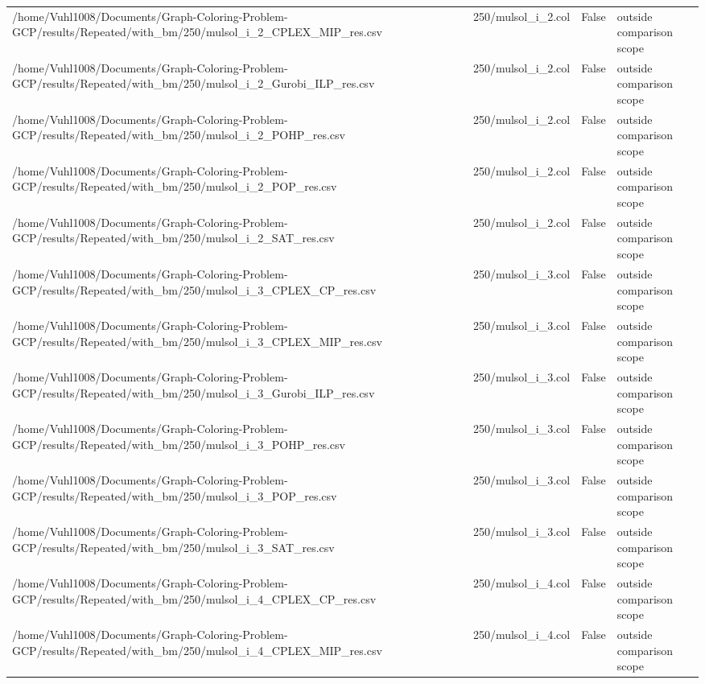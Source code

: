 \begin{table}[htbp]
\begin{tabular}{llll}
/home/Vuhl1008/Documents/Graph-Coloring-Problem-GCP/results/Repeated/with\_bm/250/mulsol\_i\_2\_CPLEX\_MIP\_res.csv & 250/mulsol\_i\_2.col & False & outside comparison scope \\
/home/Vuhl1008/Documents/Graph-Coloring-Problem-GCP/results/Repeated/with\_bm/250/mulsol\_i\_2\_Gurobi\_ILP\_res.csv & 250/mulsol\_i\_2.col & False & outside comparison scope \\
/home/Vuhl1008/Documents/Graph-Coloring-Problem-GCP/results/Repeated/with\_bm/250/mulsol\_i\_2\_POHP\_res.csv & 250/mulsol\_i\_2.col & False & outside comparison scope \\
/home/Vuhl1008/Documents/Graph-Coloring-Problem-GCP/results/Repeated/with\_bm/250/mulsol\_i\_2\_POP\_res.csv & 250/mulsol\_i\_2.col & False & outside comparison scope \\
/home/Vuhl1008/Documents/Graph-Coloring-Problem-GCP/results/Repeated/with\_bm/250/mulsol\_i\_2\_SAT\_res.csv & 250/mulsol\_i\_2.col & False & outside comparison scope \\
/home/Vuhl1008/Documents/Graph-Coloring-Problem-GCP/results/Repeated/with\_bm/250/mulsol\_i\_3\_CPLEX\_CP\_res.csv & 250/mulsol\_i\_3.col & False & outside comparison scope \\
/home/Vuhl1008/Documents/Graph-Coloring-Problem-GCP/results/Repeated/with\_bm/250/mulsol\_i\_3\_CPLEX\_MIP\_res.csv & 250/mulsol\_i\_3.col & False & outside comparison scope \\
/home/Vuhl1008/Documents/Graph-Coloring-Problem-GCP/results/Repeated/with\_bm/250/mulsol\_i\_3\_Gurobi\_ILP\_res.csv & 250/mulsol\_i\_3.col & False & outside comparison scope \\
/home/Vuhl1008/Documents/Graph-Coloring-Problem-GCP/results/Repeated/with\_bm/250/mulsol\_i\_3\_POHP\_res.csv & 250/mulsol\_i\_3.col & False & outside comparison scope \\
/home/Vuhl1008/Documents/Graph-Coloring-Problem-GCP/results/Repeated/with\_bm/250/mulsol\_i\_3\_POP\_res.csv & 250/mulsol\_i\_3.col & False & outside comparison scope \\
/home/Vuhl1008/Documents/Graph-Coloring-Problem-GCP/results/Repeated/with\_bm/250/mulsol\_i\_3\_SAT\_res.csv & 250/mulsol\_i\_3.col & False & outside comparison scope \\
/home/Vuhl1008/Documents/Graph-Coloring-Problem-GCP/results/Repeated/with\_bm/250/mulsol\_i\_4\_CPLEX\_CP\_res.csv & 250/mulsol\_i\_4.col & False & outside comparison scope \\
/home/Vuhl1008/Documents/Graph-Coloring-Problem-GCP/results/Repeated/with\_bm/250/mulsol\_i\_4\_CPLEX\_MIP\_res.csv & 250/mulsol\_i\_4.col & False & outside comparison scope \\

\end{tabular}
\end{table}
